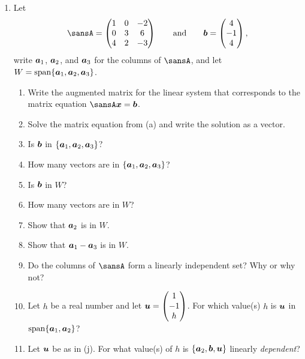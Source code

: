 \documentclass[12 pt]{article}
\newcommand{\pmat}[1]{\begin{pmatrix}#1\end{pmatrix}}
\begin{document}
\begin{enumerate}[leftmargin=0in, rightmargin=-0.25in]
	\item Let 
	\[\sansA=\pmat{1 & 0 & -2 \\ 0 & 3 & 6 \\ 4 & 2 & -3}\quad\quad\text{and}\quad\quad\vect{b}=\pmat{4 \\ -1 \\ 4},\]
	write $\boldsymbol{a}_1$, $\boldsymbol{a}_2$, and $\boldsymbol{a}_3$ for the columns of $\sansA$, and let $W=\operatorname{span}\{\boldsymbol{a}_1,\boldsymbol{a}_2,\boldsymbol{a}_3\}$.
	\begin{enumerate}
		\item Write the augmented matrix for the linear system that corresponds to the matrix equation $\sansA\vect{x}=\vect{b}$.
		\item Solve the matrix equation from (a) and write the solution as a vector.
		\item Is $\boldsymbol{b}$ in $\{\boldsymbol{a}_1,\boldsymbol{a}_2,\boldsymbol{a}_3\}$?
		\item How many vectors are in $\{\boldsymbol{a}_1,\boldsymbol{a}_2,\boldsymbol{a}_3\}$?
		\item Is $\boldsymbol{b}$ in $W$?
		\item How many vectors are in $W$?
		\item Show that $\boldsymbol{a}_2$ is in $W$.
		\item Show that $\boldsymbol{a}_1-\boldsymbol{a}_3$ is in $W$.
		\item Do the columns of $\sansA$ form a linearly independent set? Why or why not?
		\item Let $h$ be a real number and let $\vect{u}=\pmat{1 \\ -1 \\ h}$. For which value(s) $h$ is $\boldsymbol{u}$ in $\operatorname{span}\{\boldsymbol{a}_1,\boldsymbol{a}_2\}$?
		\item Let $\boldsymbol{u}$ be as in (j). For what value(s) of $h$ is $\{\boldsymbol{a}_2,\boldsymbol{b},\boldsymbol{u}\}$ linearly \textit{dependent}?
	\end{enumerate}
\end{enumerate}
\end{document}
